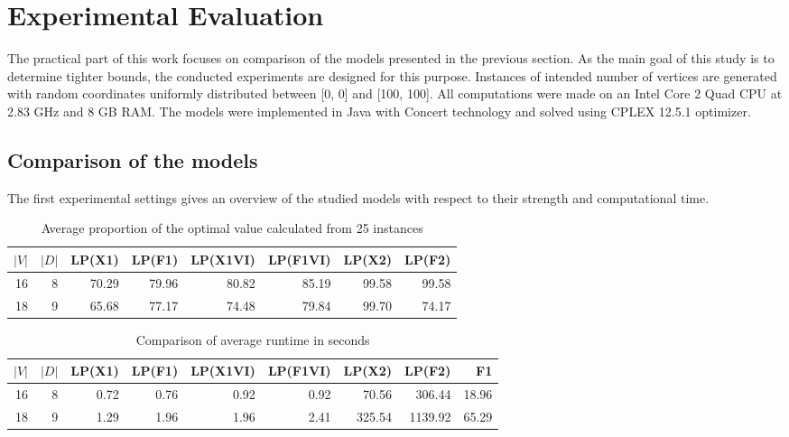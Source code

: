 \section{Experimental Evaluation}
\label{sec:exp}

The practical part of this work focuses on comparison of the models presented in the previous section.
As the main goal of this study is to determine tighter bounds, the conducted experiments are designed for this purpose.
Instances of intended number of vertices are generated with random coordinates uniformly distributed between [0, 0] and [100, 100].
All computations were made on an Intel Core 2 Quad CPU at 2.83 GHz and 8 GB RAM.
The models were implemented in Java with Concert technology and solved using CPLEX 12.5.1 optimizer.
 
\subsection{Comparison of the models}

The first experimental settings gives an overview of the studied models with respect to their strength and computational time.

\begin{table}[h!]
\centering
\setlength{\tabcolsep}{6pt} %
\renewcommand{\arraystretch}{1.4} %
\begin{tabular}{rrrrrrrr}
 $|V|$ & $|D|$ & LP(X1) & LP(F1) & LP(X1VI) & LP(F1VI) & LP(X2) & LP(F2) \\ \hline
  16 & 8       & 70.29  & 79.96  & 80.82    & 85.19    & 99.58  & 99.58\\
  18 & 9       & 65.68  & 77.17  & 74.48    & 79.84    & 99.70  & 74.17\\ 
\end{tabular}
\caption{Average proportion of the optimal value calculated from 25 instances}
\label{tab:small_inst}
\end{table}

\begin{table}[h!]
\centering
\setlength{\tabcolsep}{6pt} %
\renewcommand{\arraystretch}{1.4} %
\begin{tabular}{rrrrrrrrr}
 $|V|$ & $|D|$ & LP(X1) & LP(F1) & LP(X1VI) & LP(F1VI) & LP(X2) & LP(F2)  & F1\\ \hline
  16 & 8       & 0.72   & 0.76   & 0.92     & 0.92     & 70.56  & 306.44  & 18.96 \\
  18 & 9       & 1.29   & 1.96   & 1.96     & 2.41     & 325.54 & 1139.92 & 65.29\\ 
\end{tabular}
\caption{Comparison of average runtime in seconds}
\label{tab:small_inst}
\end{table}

